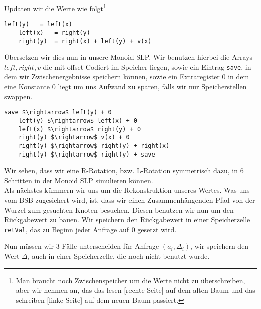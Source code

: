 \documentclass[11pt,a4paper,ngerman]{article}
\begin{document}
Updaten wir die Werte wie folgt\footnote{Man braucht noch Zwischenspeicher um die Werte nicht zu überschreiben, aber wir nehmen an,
das das lesen [rechte Seite] auf dem alten Baum und das schreiben [linke Seite] auf dem neuen Baum passiert.}
\begin{lstlisting}[frame=single]
	left(y)   = left(x)
	left(x)   = right(y)
	right(y)  = right(x) + left(y) + v(x)
\end{lstlisting}

Übersetzen wir dies nun in unsere Monoid SLP. Wir benutzen hierbei die Arrays $left, right, v$ die mit offset Codiert im Speicher liegen,
sowie ein Eintrag \lstinline|save|, in dem wir Zwischenergebnisse speichern können, sowie ein Extraregister $0$ in dem eine Konstante $0$
liegt um uns Aufwand zu sparen, falls wir nur Speicherstellen swappen.

\begin{lstlisting}[frame=single]
	save $\rightarrow$ left(y) + 0
	left(y) $\rightarrow$ left(x) + 0
	left(x) $\rightarrow$ right(y) + 0
	right(y) $\rightarrow$ v(x) + 0
	right(y) $\rightarrow$ right(y) + right(x)
	right(y) $\rightarrow$ right(y) + save
\end{lstlisting}

Wir sehen, dass wir eine R-Rotation, bzw. L-Rotation symmetrisch dazu, in $6$ Schritten in der Monoid SLP simulieren können.\\

Als nächstes kümmern wir uns um die Rekonstruktion unseres Wertes. Was uns vom BSB zugesichert wird, ist, dass wir einen Zusammenhängenden Pfad von der Wurzel zum gesuchten Knoten besuchen. Diesen benutzen wir nun um den Rückgabewert zu bauen. Wir speichern den Rückgabewert
in einer Speicherzelle \lstinline|retVal|, das zu Beginn jeder Anfrage auf $0$ gesetzt wird.

Nun müssen wir 3 Fälle unterscheiden für Anfrage $(a_i, \Delta_i)$, wir speichern den Wert $\Delta_i$ auch in einer Speicherzelle, die noch nicht benutzt wurde.
\end{document}
